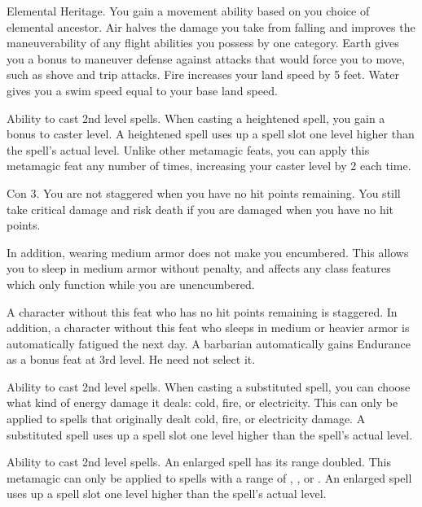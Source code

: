 \featpre Elemental Heritage.
\featben You gain a movement ability based on you choice of elemental ancestor. Air halves the damage you take from falling and improves the maneuverability of any flight abilities you possess by one category. Earth gives you a  bonus to maneuver defense against attacks that would force you to move, such as shove and trip attacks. Fire increases your land speed by 5 feet. Water gives you a swim speed equal to your base land speed.

 Ability to cast 2nd level spells.
 When casting a heightened spell, you gain a  bonus to caster level. A heightened spell uses up a spell slot one level higher than the spell's actual level. Unlike other metamagic feats, you can apply this metamagic feat any number of times, increasing your caster level by 2 each time.

\featpre Con 3.
 You are not staggered when you have no hit points remaining. You still take critical damage and risk death if you are damaged when you have no hit points.

In addition, wearing medium armor does not make you encumbered. This allows you to sleep in medium armor without penalty, and affects any class features which only function while you are unencumbered.

 A character without this feat who has no hit points remaining is staggered. In addition, a character without this feat who sleeps in medium or heavier armor is automatically fatigued the next day.
 A barbarian automatically gains Endurance as a bonus feat at 3rd level. He need not select it.

 Ability to cast 2nd level spells.
 When casting a substituted spell, you can choose what kind of energy damage it deals: cold, fire, or electricity. This can only be applied to spells that originally dealt cold, fire, or electricity damage. A substituted spell uses up a spell slot one level higher than the spell's actual level.

 Ability to cast 2nd level spells.
 An enlarged spell has its range doubled. This metamagic can only be applied to spells with a range of \rngclose, \rngmed, or \rnglong. An enlarged spell uses up a spell slot one level higher than the spell's actual level.


